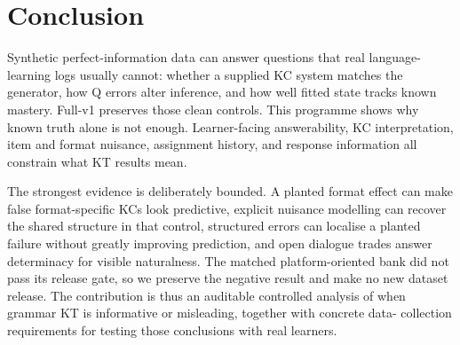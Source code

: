 \section{Conclusion}

Synthetic perfect-information data can answer questions that real
language-learning logs usually cannot: whether a supplied KC system matches the
generator, how Q errors alter inference, and how well fitted state tracks known
mastery.  Full-v1 preserves those clean controls.  This programme shows why
known truth alone is not enough.  Learner-facing answerability, KC
interpretation, item and format nuisance, assignment history, and response
information all constrain what KT results mean.

The strongest evidence is deliberately bounded.  A planted format effect can
make false format-specific KCs look predictive, explicit nuisance modelling can
recover the shared structure in that control, structured errors can localise a
planted failure without greatly improving prediction, and open dialogue trades
answer determinacy for visible naturalness.  The matched platform-oriented bank
did not pass its release gate, so we preserve the negative result and make no
new dataset release.  The contribution is thus an auditable controlled analysis
of when grammar KT is informative or misleading, together with concrete data-
collection requirements for testing those conclusions with real learners.
